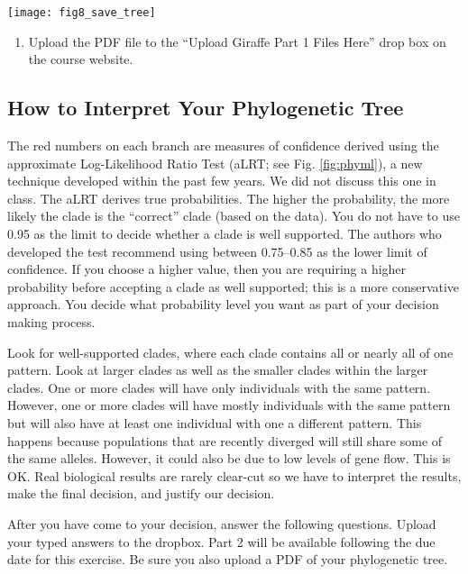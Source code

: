 \documentclass[11pt, addpoints]{exam}
\begin{document}
\begin{center}
	\texttt{[image: fig8\_save\_tree]}
\end{center}

\begin{enumerate}
\item
  Upload the PDF file to the ``Upload Giraffe Part 1 Files Here'' drop
  box on the course website.
\end{enumerate}

\subsection*{How to Interpret Your Phylogenetic Tree}

The red numbers on each branch are measures of confidence derived using
the approximate Log-Likelihood Ratio Test (aLRT; see Fig. \ref{fig:phyml}), a new
technique developed within the past few years. We did not discuss this
one in class. The aLRT derives true probabilities. The higher the
probability, the more likely the clade is the ``correct'' clade (based
on the data). You do not have to use 0.95 as the limit to decide whether
a clade is well supported. The authors who developed the test recommend
using between 0.75--0.85 as the lower limit of confidence. If you choose
a higher value, then you are requiring a higher probability before
accepting a clade as well supported; this is a more conservative
approach. You decide what probability level you want as part of your
decision making process.

Look for well-supported clades, where each clade contains all or nearly
all of one pattern. Look at larger clades as well as the smaller clades
within the larger clades. One or more clades will have only individuals
with the same pattern. However, one or more clades will have mostly
individuals with the same pattern but will also have at least one
individual with one a different pattern. This happens because
populations that are recently diverged will still share some of the same
alleles. However, it could also be due to low levels of gene flow. This
is OK. Real biological results are rarely clear-cut so we have to
interpret the results, make the final decision, and justify our
decision.

After you have come to your decision, answer the following questions. 
Upload your typed answers to the dropbox. Part 2 will be available following 
the due date for this exercise. Be sure you also upload a PDF of your phylogenetic tree.
\end{document}
